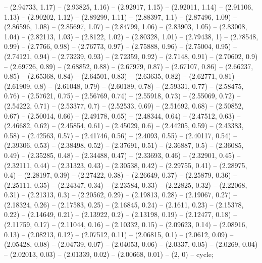 -- (2.94733, 1.17)
-- (2.93825, 1.16)
-- (2.92917, 1.15)
-- (2.92011, 1.14)
-- (2.91106, 1.13)
-- (2.90202, 1.12)
-- (2.89299, 1.11)
-- (2.88397, 1.1)
-- (2.87496, 1.09)
-- (2.86596, 1.08)
-- (2.85697, 1.07)
-- (2.84799, 1.06)
-- (2.83903, 1.05)
-- (2.83008, 1.04)
-- (2.82113, 1.03)
-- (2.8122, 1.02)
-- (2.80328, 1.01)
-- (2.79438, 1)
-- (2.78548, 0.99)
-- (2.7766, 0.98)
-- (2.76773, 0.97)
-- (2.75888, 0.96)
-- (2.75004, 0.95)
-- (2.74121, 0.94)
-- (2.73239, 0.93)
-- (2.72359, 0.92)
-- (2.7148, 0.91)
-- (2.70602, 0.9)
-- (2.69726, 0.89)
-- (2.68852, 0.88)
-- (2.67979, 0.87)
-- (2.67107, 0.86)
-- (2.66237, 0.85)
-- (2.65368, 0.84)
-- (2.64501, 0.83)
-- (2.63635, 0.82)
-- (2.62771, 0.81)
-- (2.61909, 0.8)
-- (2.61048, 0.79)
-- (2.60189, 0.78)
-- (2.59331, 0.77)
-- (2.58475, 0.76)
-- (2.57621, 0.75)
-- (2.56769, 0.74)
-- (2.55918, 0.73)
-- (2.55069, 0.72)
-- (2.54222, 0.71)
-- (2.53377, 0.7)
-- (2.52533, 0.69)
-- (2.51692, 0.68)
-- (2.50852, 0.67)
-- (2.50014, 0.66)
-- (2.49178, 0.65)
-- (2.48344, 0.64)
-- (2.47512, 0.63)
-- (2.46682, 0.62)
-- (2.45854, 0.61)
-- (2.45029, 0.6)
-- (2.44205, 0.59)
-- (2.43383, 0.58)
-- (2.42563, 0.57)
-- (2.41746, 0.56)
-- (2.4093, 0.55)
-- (2.40117, 0.54)
-- (2.39306, 0.53)
-- (2.38498, 0.52)
-- (2.37691, 0.51)
-- (2.36887, 0.5)
-- (2.36085, 0.49)
-- (2.35285, 0.48)
-- (2.34488, 0.47)
-- (2.33693, 0.46)
-- (2.32901, 0.45)
-- (2.32111, 0.44)
-- (2.31323, 0.43)
-- (2.30538, 0.42)
-- (2.29755, 0.41)
-- (2.28975, 0.4)
-- (2.28197, 0.39)
-- (2.27422, 0.38)
-- (2.26649, 0.37)
-- (2.25879, 0.36)
-- (2.25111, 0.35)
-- (2.24347, 0.34)
-- (2.23584, 0.33)
-- (2.22825, 0.32)
-- (2.22068, 0.31)
-- (2.21313, 0.3)
-- (2.20562, 0.29)
-- (2.19813, 0.28)
-- (2.19067, 0.27)
-- (2.18324, 0.26)
-- (2.17583, 0.25)
-- (2.16845, 0.24)
-- (2.1611, 0.23)
-- (2.15378, 0.22)
-- (2.14649, 0.21)
-- (2.13922, 0.2)
-- (2.13198, 0.19)
-- (2.12477, 0.18)
-- (2.11759, 0.17)
-- (2.11044, 0.16)
-- (2.10332, 0.15)
-- (2.09623, 0.14)
-- (2.08916, 0.13)
-- (2.08213, 0.12)
-- (2.07512, 0.11)
-- (2.06815, 0.1)
-- (2.0612, 0.09)
-- (2.05428, 0.08)
-- (2.04739, 0.07)
-- (2.04053, 0.06)
-- (2.0337, 0.05)
-- (2.0269, 0.04)
-- (2.02013, 0.03)
-- (2.01339, 0.02)
-- (2.00668, 0.01)
-- (2, 0)
-- cycle;
